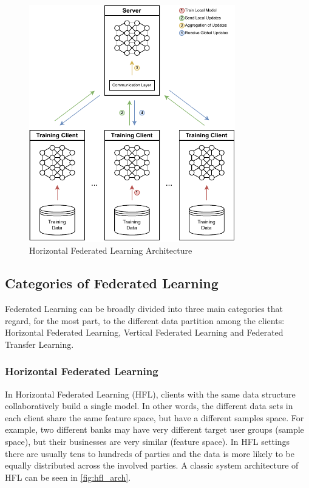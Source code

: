 \begin{figure}[!ht]
    \centering
    \includegraphics[width=0.8\textwidth]{graphics/hfl-architecture.pdf}
    \caption{Horizontal Federated Learning Architecture}
    \label{fig:hfl_arch}
\end{figure}

\subsection{Categories of Federated Learning}

Federated Learning can be broadly divided into three main categories \cite{10.1145/3298981, 10.1145/3412357} that regard, for the most part, to the different data partition among the clients: Horizontal Federated Learning, Vertical Federated Learning and Federated Transfer Learning.

\subsubsection{Horizontal Federated Learning}

In Horizontal Federated Learning (HFL), clients with the same data structure collaboratively build a single model. In other words, the different data sets in each client share the same feature space, but have a different samples space. For example, two different banks may have very different target user groups (sample space), but their businesses are very similar (feature space). In HFL settings there are usually tens to hundreds of parties and the data is more likely to be equally distributed across the involved parties. A classic system architecture of HFL can be seen in \autoref{fig:hfl_arch}.

